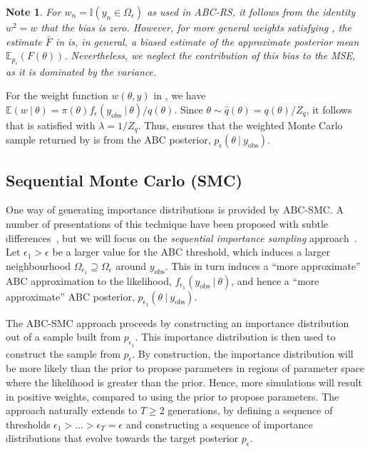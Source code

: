 \documentclass[12pt, onecolumn]{article}
\newcommand{\obs}[1]{#1_{\mathrm{obs}}}
\newtheorem{note}[theorem]{Note}
\begin{document}
\begin{note}
For $w_n = \mathbb I(y_n \in \Omega_\epsilon)$ as used in ABC-RS, it follows from the identity $w^2 = w$ that the bias is zero.
However, for more general weights satisfying , the estimate $\bar F$ in  is, in general, a biased estimate of the approximate posterior mean $\mathbb E_{p_\epsilon}(F(\theta))$.
Nevertheless, we neglect the contribution of this bias to the MSE, as it is dominated by the variance.
\end{note}

For the weight function $w(\theta, y)$ in , we have $\mathbb E(w~|~\theta) = \pi(\theta) f_\epsilon(\obs y~|~\theta) / q(\theta)$.
Since $\theta \sim \hat q(\theta) = q(\theta)/Z_q$, it follows that  is satisfied with $\lambda = 1/Z_q$.
Thus,  ensures that the weighted Monte Carlo sample returned by  is from the ABC posterior, $p_\epsilon(\theta~|~\obs y)$.

\subsection{Sequential Monte Carlo (SMC)}
\label{s:SMC}

One way of generating importance distributions is provided by ABC-SMC.
A number of presentations of this technique have been proposed with subtle differences~\cite{Beaumont2009,DelMoral2006,Sisson2007}, but we will focus on the \emph{sequential importance sampling} approach~\cite{Toni2009}. 
Let $\epsilon_1 > \epsilon$ be a larger value for the ABC threshold, which induces a larger neighbourhood $\Omega_{\epsilon_1} \supseteq \Omega_\epsilon$ around $\obs y$.
This in turn induces a ``more approximate'' ABC approximation to the likelihood, $f_{\epsilon_1}(\obs y~|~\theta)$, and hence a ``more approximate'' ABC posterior, $p_{\epsilon_1}(\theta~|~\obs y)$.

The ABC-SMC approach proceeds by constructing an importance distribution out of a sample built from $p_{\epsilon_1}$.
This importance distribution is then used to construct the sample from $p_\epsilon$.
By construction, the importance distribution will be more likely than the prior to propose parameters in regions of parameter space where the likelihood is greater than the prior.
Hence, more simulations will result in positive weights, compared to using the prior to propose parameters.
The approach naturally extends to $T \geq 2$ generations, by defining a sequence of thresholds $\epsilon_1 > \dots > \epsilon_T = \epsilon$ and constructing a sequence of importance distributions that evolve towards the target posterior $p_\epsilon$.
\end{document}

